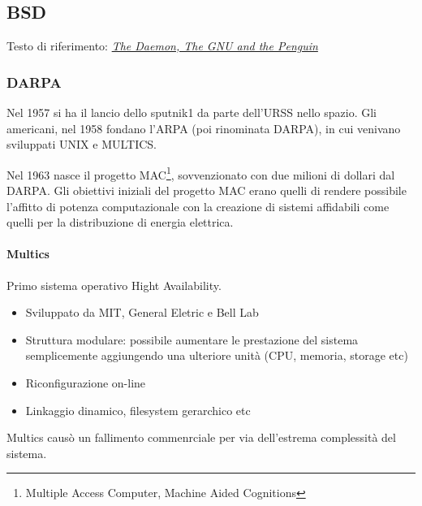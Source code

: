\subsection{BSD}

Testo di riferimento: \href{http://www.groklaw.net/staticpages/index.php?page=20051013231901859}{\textit{The Daemon, The GNU and the Penguin}}

\subsubsection{DARPA}

Nel 1957 si ha il lancio dello sputnik1 da parte dell'URSS nello spazio. Gli americani, nel 1958 fondano l'ARPA (poi rinominata DARPA), in cui venivano sviluppati UNIX e MULTICS.

Nel 1963 nasce il progetto MAC\footnote{Multiple Access Computer, Machine Aided Cognitions}, sovvenzionato con due milioni di dollari dal DARPA. Gli obiettivi iniziali del progetto MAC erano quelli di rendere possibile l'affitto di potenza computazionale con la creazione di sistemi affidabili come quelli per la distribuzione di energia elettrica.

\paragraph*{Multics} Primo sistema operativo Hight Availability. \begin{itemize}

\item Sviluppato da MIT, General Eletric e Bell Lab
\item Struttura modulare: possibile aumentare le prestazione del sistema semplicemente aggiungendo una ulteriore unit\`a (CPU, memoria, storage etc)
\item Riconfigurazione on-line
\item Linkaggio dinamico, filesystem gerarchico etc

\end{itemize}

Multics caus\`o un fallimento commenrciale per via dell'estrema complessit\`a del sistema.

